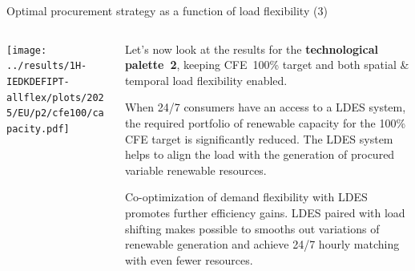 \begin{frame}{Optimal procurement strategy as a function of load flexibility (3)}

  {\footnotesize
  \vspace{0.2cm}
  
  \begin{columns}[T]

  \begin{column}{9cm}
  \centering
  \texttt{[image: ../results/1H-IEDKDEFIPT-allflex/plots/2025/EU/p2/cfe100/capacity.pdf]}
  \end{column}

  \begin{column}{6cm}
  \vspace{0.1cm}
  Let's now look at the results for the {\bf technological palette~2}, keeping CFE~100\% target and both spatial \& temporal load flexibility enabled.
  
  \vspace{0.1cm} 
  When 24/7 consumers have an access to a LDES system, the required portfolio of renewable capacity for the 100\% CFE target is significantly reduced. The LDES system helps to align the load with the generation of procured variable renewable resources. 
  
  \vspace{0.1cm} 
  Co-optimization of demand flexibility with LDES \alert{promotes further efficiency gains}. LDES paired with load shifting makes possible to smooths out variations of renewable generation and achieve 24/7 hourly matching with even fewer resources.

  \end{column}
  \end{columns}
  }
\end{frame}


